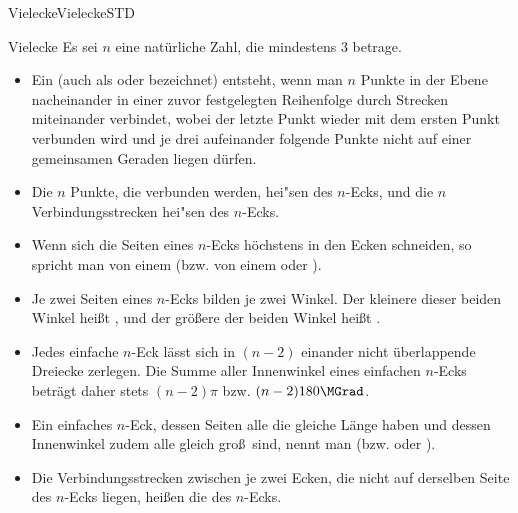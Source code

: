\begin{MXContent}{Vielecke}{Vielecke}{STD}
\begin{MXInfo}{Vielecke}%
Es sei $n$ eine nat\"urliche Zahl, die mindestens $3$ betrage.
\begin{itemize}
 \item 
Ein  (auch als  oder 
 bezeichnet) entsteht,
wenn man $n$ Punkte in der Ebene nacheinander in einer zuvor festgelegten 
Reihenfolge durch Strecken miteinander verbindet,
wobei der letzte Punkt wieder mit dem ersten Punkt verbunden wird und je drei 
aufeinander folgende Punkte nicht auf einer gemeinsamen Geraden liegen d\"urfen.
       
 \item Die $n$ Punkte, die verbunden werden, hei"sen 
   des $n$-Ecks, und
  die $n$ Verbindungsstrecken hei"sen
   des $n$-Ecks.

 \item Wenn sich die Seiten eines $n$-Ecks h\"ochstens in den Ecken schneiden, so spricht man von einem  (bzw. von einem  oder ).  

 \item Je zwei Seiten eines $n$-Ecks bilden je zwei Winkel.
Der kleinere dieser beiden Winkel hei\ss t
,
       und der gr\"o\ss ere der beiden Winkel hei\ss t
       .

\item Jedes einfache $n$-Eck l\"asst sich in $(n-2)$ einander nicht \"uberlappende Dreiecke zerlegen. Die Summe aller Innenwinkel eines einfachen $n$-Ecks betr\"agt daher stets $(n-2)\pi$ bzw. $(n-2)180\MGrad$.

 \item Ein einfaches $n$-Eck, dessen Seiten alle die gleiche L\"ange haben und dessen Innenwinkel zudem alle gleich gro\ss\ sind, nennt man
 (bzw.  oder ).

\item Die Verbindungsstrecken zwischen je zwei Ecken, die nicht auf derselben Seite des $n$-Ecks liegen, hei\ss en die  des $n$-Ecks.
\end{itemize}
\end{MXInfo}

\end{MXContent}



